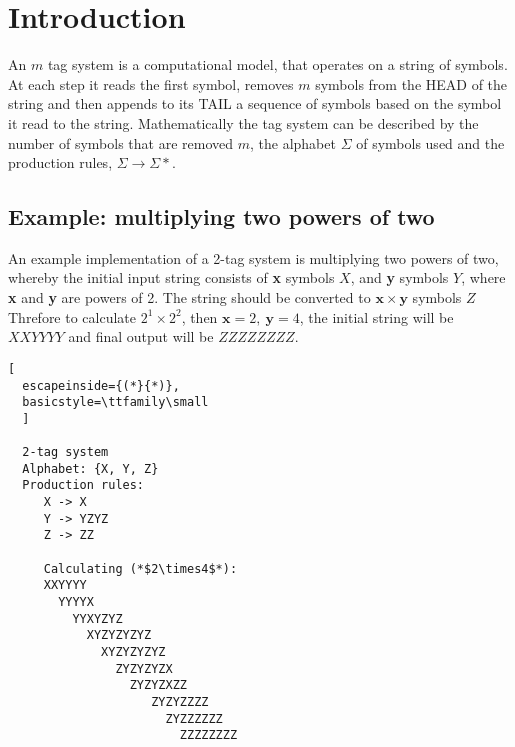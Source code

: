 \documentclass[
11pt, %
a4paper, %
oneside, %
headinclude,footinclude, %
BCOR5mm, %
]{scrartcl}
\begin{document}




\newpage %


\section{Introduction}

An $m$ tag system is a computational model, that operates on a string of symbols.
At each step it reads the first symbol, removes $m$ symbols from the HEAD of the
string and then appends to its TAIL a sequence of symbols based on the symbol it read to the
string. Mathematically the tag system can be described by the number of symbols
that are removed $m$, the alphabet $\Sigma$ of symbols used and the production
rules, $\Sigma \to \Sigma*$.

\subsection{Example: multiplying two powers of two}
An example implementation of a 2-tag system is multiplying two powers of two, whereby the initial input string consists of \textbf{x} symbols $X$, and \textbf{y} symbols $Y$, where \textbf{x} and \textbf{y} are powers of 2. The string should be converted to $\mathbf{x}\times \mathbf{y}$ symbols $Z$ Threfore to calculate $2^1\times2^2$, then $\mathbf{x}=2,\ \mathbf{y}=4$, the initial string will be $XXYYYY$ and final output will be $ZZZZZZZZ$.

\begin{lstlisting}[
  escapeinside={(*}{*)},
  basicstyle=\ttfamily\small
  ]
  
  2-tag system
  Alphabet: {X, Y, Z}
  Production rules:
     X -> X
     Y -> YZYZ
     Z -> ZZ

     Calculating (*$2\times4$*):
     XXYYYY
       YYYYX
         YYXYZYZ
           XYZYZYZYZ
             XYZYZYZYZ
               ZYZYZYZX
                 ZYZYZXZZ
                    ZYZYZZZZ
                      ZYZZZZZZ
                        ZZZZZZZZ
   
\end{lstlisting}
\end{document}
